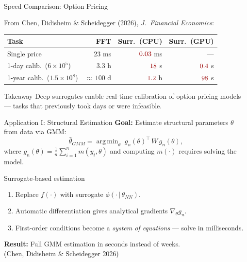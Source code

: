 \documentclass[aspectratio=169,11pt]{beamer}
\newcommand{\emphc}[1]{\textcolor{harvardcrimson}{#1}}
\DeclareMathOperator*{\argmin}{arg\,min}
\begin{document}
\begin{frame}{Speed Comparison: Option Pricing}
\begin{center}
{\footnotesize From Chen, Didisheim \& Scheidegger (2026), \emph{J.\ Financial Economics}:}

\vspace{0.2cm}
\small
\begin{tabular}{l r r r}
\toprule
\textbf{Task} & \textbf{FFT} & \textbf{Surr.\ (CPU)} & \textbf{Surr.\ (GPU)} \\
\midrule
Single price & $23$ ms & $\emphc{0.03}$ ms & --- \\
1-day calib.\ ($6\!\times\!10^5$) & $3.3$ h & $\emphc{18}$ s & $\emphc{0.4}$ s\\
1-year calib.\ ($1.5\!\times\!10^8$) & ${\approx}\,100$ d & $\emphc{1.2}$ h & $\emphc{98}$ s\\
\bottomrule
\end{tabular}
\end{center}

\vspace{0.3cm}
\begin{alertblock}{Takeaway}
Deep surrogates enable \emphc{real-time calibration} of option pricing models --- tasks that previously took days or were infeasible.
\end{alertblock}
\end{frame}

\begin{frame}{Application I: Structural Estimation}
\textbf{Goal:} Estimate structural parameters $\theta$ from data via GMM:
\[
\hat{\theta}_{GMM} = \argmin_\theta\; g_n(\theta)^\top \, W \, g_n(\theta),
\]
where $g_n(\theta) = \frac{1}{n}\sum_{i=1}^n m(y_i, \theta)$ and computing $m(\cdot)$ requires solving the model.

\vspace{0.3cm}
\begin{block}{Surrogate-based estimation}
\begin{enumerate}
  \item Replace $f(\cdot)$ with surrogate $\phi(\cdot\,|\,\theta_{NN})$.
  \item \emphc{Automatic differentiation} gives analytical gradients $\nabla_\theta g_n$.
  \item First-order conditions become a \emph{system of equations} --- solve in milliseconds.
\end{enumerate}
\end{block}

\vspace{0.3cm}
{\small \textbf{Result:} Full GMM estimation in \emphc{seconds} instead of weeks.\\
(Chen, Didisheim \& Scheidegger 2026)}
\end{frame}
\end{document}

